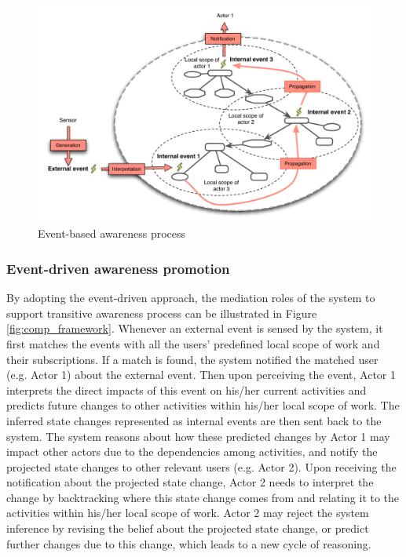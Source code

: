 \begin{figure}[htbp] %
   \centering
   \includegraphics[width=5.5in]{event_process.pdf} 
   \caption{Event-based awareness process}
   \label{fig:event_process}
\end{figure}

\subsubsection{Event-driven awareness promotion} %
\label{ssub:event_driven_awareness_promotion}
By adopting the event-driven approach, the mediation roles of the system to support transitive awareness process can be illustrated in Figure \ref{fig:comp_framework}. Whenever an external event is sensed by the system, it first matches the events with all the users’ predefined local scope of work and their subscriptions. If a match is found, the system notified the matched user (e.g. Actor 1) about the external event. Then upon perceiving the event, Actor 1 interprets the direct impacts of this event on his/her current activities and predicts future changes to other activities within his/her local scope of work. The inferred state changes represented as internal events are then sent back to the system. The system reasons about how these predicted changes by Actor 1 may impact other actors due to the dependencies among activities, and notify the projected state changes to other relevant users (e.g. Actor 2). Upon receiving the notification about the projected state change, Actor 2 needs to interpret the change by backtracking where this state change comes from and relating it to the activities within his/her local scope of work. Actor 2 may reject the system inference by revising the belief about the projected state change, or predict further changes due to this change, which leads to a new cycle of reasoning.

